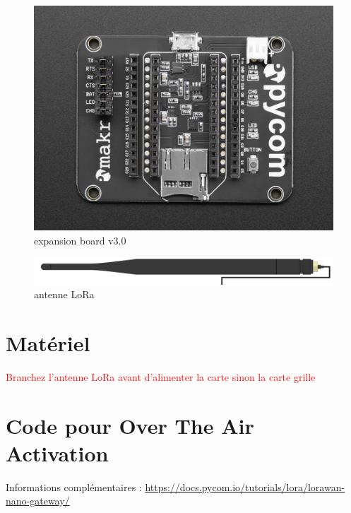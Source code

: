 \documentclass{article}
\begin{document}
\begin{figure}[H]
\begin{minipage}[b]{0.4\textwidth}
   \includegraphics[keepaspectratio=true,scale=0.5]{pycom_expansion_board.jpeg}
    \caption{expansion board v3.0}
  \end{minipage}
\end{figure}

    \begin{figure}[H]
\begin{center}
\advance\leftskip-3cm
\advance\rightskip-3cm
\includegraphics[keepaspectratio=true,scale=0.2]{lora_antenna.png}
\caption{antenne LoRa}
\label{visina8}
\end{center}\end{figure}



\section{Matériel}
\textcolor{red}{Branchez l'antenne LoRa avant d'alimenter la carte sinon la carte grille}





\section{Code pour Over The Air Activation}

Informations complémentaires : \url{https://docs.pycom.io/tutorials/lora/lorawan-nano-gateway/}\\
\end{document}
